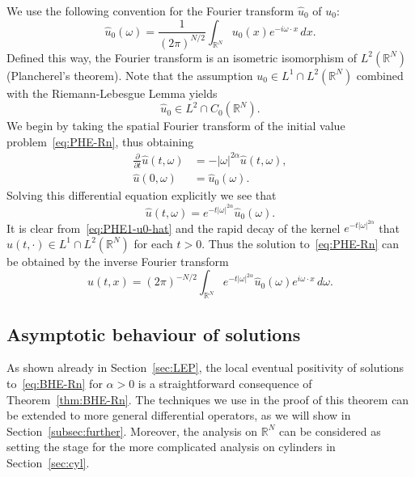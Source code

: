\documentclass[a4paper, reqno]{amsart}
\numberwithin{equation}{section}
\theoremstyle{plain}
\theoremstyle{definition}
\theoremstyle{remark}
\newcommand{\RR}{\mathbb{R}}
\begin{document}
We use the following convention for the Fourier transform $\widehat{u}_0$ of $u_0$:
\begin{equation*}
  \widehat{u}_0(\omega)
  = \frac{1}{(2\pi)^{N/2}} \int_{\RR^N} u_0(x) e^{-i \omega \cdot x} \,dx.
\end{equation*}
Defined this way, the Fourier transform is an isometric isomorphism of $L^2(\RR^N)$ (Plancherel's theorem). Note that the assumption $u_0 \in L^1 \cap L^2(\RR^N)$ combined with the Riemann-Lebesgue Lemma yields
\begin{equation}
  \label{eq:PHE1-u0-hat}
  \widehat{u}_0 \in L^2\cap C_0(\RR^N).
\end{equation}
We begin by taking the spatial Fourier transform of the initial value problem~\eqref{eq:PHE-Rn}, thus obtaining
\begin{equation*}
  \begin{aligned}
    \frac{\partial}{\partial t}\widehat{u}(t,\omega)
     & = -|\omega|^{2\alpha} \widehat{u}(t,\omega), \\
    \widehat{u}(0, \omega)
     & = \widehat{u}_0(\omega).
  \end{aligned}
\end{equation*}
Solving this differential equation explicitly we see that
\begin{equation*}
  \widehat{u}(t, \omega) = e^{-t|\omega|^{2\alpha}} \widehat{u}_0(\omega).
\end{equation*}
It is clear from~\eqref{eq:PHE1-u0-hat} and the rapid decay of the kernel $e^{-t|\omega|^{2\alpha}}$ that $\widehat{u}(t, \cdot) \in L^1 \cap L^2(\RR^N)$ for each $t > 0$. Thus the solution to~\eqref{eq:PHE-Rn} can be obtained by the inverse Fourier transform
\begin{equation}
  \label{eq:PHE-Rn-sol}
  u(t, x) = (2\pi)^{-N/2}\int_{\RR^N} e^{-t|\omega|^{2\alpha}} \widehat{u}_0(\omega) e^{i \omega \cdot x} \,d\omega.
\end{equation}

\subsection{Asymptotic behaviour of solutions}

As shown already in Section~\ref{sec:LEP}, the local eventual positivity of solutions to~\eqref{eq:BHE-Rn} for $\alpha>0$ is a straightforward consequence of Theorem~\ref{thm:BHE-Rn}. The techniques we use in the proof of this theorem can be extended to more general differential operators, as we will show in  Section~\ref{subsec:further}. Moreover, the analysis on $\RR^N$ can be considered as setting the stage for the more complicated analysis on cylinders in Section~\ref{sec:cyl}.
\end{document}
